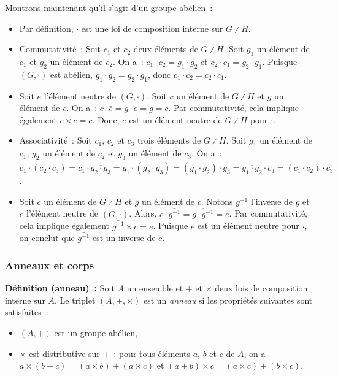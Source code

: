     Montrons maintenant qu'il s'agit d'un groupe abélien : 
    \begin{itemize}[nosep]
        \item Par définition, $\cdot$ est une loi de composition interne sur $G \divslash H$.
        \item Commutativité : Soit $c_1$ et $c_2$ deux éléments de $G \divslash H$.
            Soit $g_1$ un élément de $c_1$ et $g_2$ un élément de $c_2$. 
            On a : $c_1 \cdot c_2 = \overline{g_1 \cdot g_2}$ et $c_2 \cdot c_1 = \overline{g_2 \cdot g_1}$.
            Puisque $(G, \cdot)$ est abélien, $g_1 \cdot g_2 = g_2 \cdot g_1$, donc $c_1 \cdot c_2 = c_2 \cdot c_1$.
        \item Soit $e$ l'élément neutre de $(G, \cdot)$. 
            Soit $c$ un élément de $G \divslash H$ et $g$ un élément de $c$. 
            On a : $c \cdot \bar{e} = \overline{g \cdot e} = \bar{g} = c$.
            Par commutativité, cela implique également $\bar{e} \times c = c$.
            Donc, $\bar{e}$ est un élément neutre de $G \divslash H$ pour $\cdot$.
        \item Associativité : Soit $c_1$, $c_2$ et $c_3$ trois éléments de $G \divslash H$.
            Soit $g_1$ un élément de $c_1$, $g_2$ un élément de $c_2$ et $g_3$ un élément de $c_3$.
            On a : $c_1 \cdot (c_2 \cdot c_3) = c_1 \cdot \overline{g_2 \cdot g_3} = \overline{g_1 \cdot (g_2 \cdot g_3)} = \overline{(g_1 \cdot g_2) \cdot g_3} = \overline{g_1 \cdot g_2} \cdot c_3 = (c_1 \cdot c_2) \cdot c_3$.
        \item Soit $c$ un élément de $G \divslash H$ et $g$ un élément de $c$. 
            Notons $g^{-1}$ l'inverse de $g$ et $e$ l'élément neutre de $(G,\cdot)$. 
            Alors, $c \cdot \bar{g^{-1}} = \overline{g \cdot g^{-1}} = \bar{e}$.
            Par commutativité, cela implique également $\bar{g^{-1}} \times c = \bar{e}$.
            Puisque $\bar{e}$ est un élément neutre pour $\cdot$, on conclut que $\bar{g^{-1}}$ est un inverse de $c$.
    \end{itemize}

    \done

\subsubsection{Anneaux et corps}

\noindent\textbf{Définition (anneau) :} Soit $A$ un ensemble et $+$ et $\times$ deux lois de composition interne sur $A$. 
    Le triplet $(A, +, \times)$ est un \textit{anneau} si les propriétés suivantes sont satisfaites : 
    \begin{itemize}[nosep]
        \item $(A,+)$ est un groupe abélien,
        \item $\times$ est distributive sur $+$ : pour tous éléments $a$, $b$ et $c$ de $A$, on a $a \times (b + c) = (a \times b) + (a \times c)$ et $(a + b) \times c = (a \times c) + (b \times c)$.
    \end{itemize}

